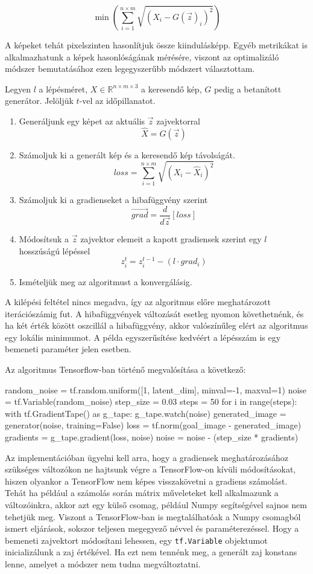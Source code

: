 $$ \min\left(\sum_{i=1}^{n\times m}\sqrt{(X_i-G(\vec{z})_i)^2}\right)$$

A képeket tehát pixelszinten hasonlítjuk össze kiindulásképp.
Egyéb metrikákat is alkalmazhatunk a képek hasonlóságának mérésére, viszont az optimalizáló módszer bemutatásához ezen legegyszerűbb módszert választottam.

Legyen $l$ a lépésméret, $X \in \mathbb{R}^{n\times m \times 3}$ a keresendő kép, $G$ pedig a betanított generátor. Jelöljük $t$-vel az időpillanatot.
\begin{enumerate}
	\item Generáljunk egy képet az aktuális $\vec{z}$ zajvektorral
$$\hat X = G(\vec{z})$$
	\item Számoljuk ki a generált kép és a keresendő kép távolságát.
$$ loss = \sum_{i=1}^{n\times m}\sqrt{(X_i-\hat X_i)^2} $$
	\item Számoljuk ki a gradienseket a hibafüggvény szerint
$$ \vec{grad} = \frac{d}{d\vec{z}} \left[loss\right]$$
	\item Módosítsuk a $\vec{z}$ zajvektor elemeit a kapott gradiensek szerint egy $l$ hosszúságú lépéssel
$$ z_i^t = z_i^{t-1} - (l \cdot grad_i)$$
	\item Ismételjük meg az algoritmust a konvergálásig.
\end{enumerate}

A kilépési feltétel nincs megadva, így az algoritmus előre meghatározott iterációszámig fut. A hibafüggvények változását esetleg nyomon követhetnénk, és ha két érték között oszcillál a hibafüggvény, akkor valószínűleg elért az algoritmus egy lokális minimumot. A példa egyszerűsítése kedvéért a lépésszám is egy bemeneti paraméter jelen esetben.

Az algoritmus Tensorflow-ban történő megvalósítása a következő:

\begin{python}
random_noise = tf.random.uniform([1, latent_dim], minval=-1, maxval=1)
noise = tf.Variable(random_noise)
step_size = 0.03
steps = 50
for i in range(steps):
    with tf.GradientTape() as g_tape:
        g_tape.watch(noise)
        generated_image = generator(noise, training=False)
        loss = tf.norm(goal_image - generated_image)
    gradients = g_tape.gradient(loss, noise)
    noise = noise - (step_size * gradients)
\end{python}

Az implementációban ügyelni kell arra, hogy a gradiensek meghatározásához szükséges változókon ne hajtsunk végre a TensorFlow-on kívüli módosításokat, hiszen olyankor a TensorFlow nem képes visszakövetni a gradiens számolást. Tehát ha például a számolás során mátrix műveleteket kell alkalmazunk a változóinkra, akkor azt egy külső csomag, például Numpy segítségével sajnos nem tehetjük meg. Viszont a TensorFlow-ban is megtalálhatóak a Numpy csomagból ismert eljárások, sokszor teljesen megegyező névvel és paraméterezéssel. Hogy a bemeneti zajvektort módosítani lehessen, egy \texttt{tf.Variable} objektumot inicializálunk a zaj értékével. Ha ezt nem tennénk meg, a generált zaj konstans lenne, amelyet a módszer nem tudna megváltoztatni.

